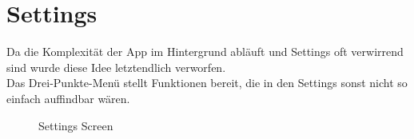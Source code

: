 \documentclass[
    DIV12,
    cleardouble=plain,
    headings=normal,
    pdftex,
    headexclude,footexclude,
    final
]{scrreprt}
\begin{document}
\section{Settings}
Da die Komplexität der App im Hintergrund abläuft und Settings oft verwirrend sind wurde diese Idee letztendlich verworfen. \\
Das Drei-Punkte-Menü stellt Funktionen bereit, die in den Settings sonst nicht so einfach auffindbar wären.
\begin{figure}[H]
	\centering
	\caption{Settings Screen}
	\label{settings}
\end{figure}
\end{document}
